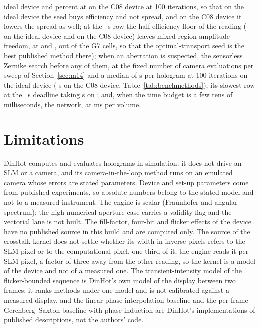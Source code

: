 ideal device and \gsMrafDeviceHundredSig{} percent at \gsMrafDeviceHundredEff{} on the C08 device at 100 iterations, so that on the ideal device the seed buys efficiency and not spread, and on the C08 device it lowers the spread as well; at the \dlReadS{}~s row the half-efficiency floor of the reading (\gsFloorIdeal{} on the ideal device and \gsFloorDevice{} on the C08 device) leaves mixed-region amplitude freedom, at \gsMrafIdealOneEff{} and \gsMrafDeviceOneEff{}, out of the G7 cells, so that the optimal-transport seed is the best published method there); when an aberration is suspected, the sensorless Zernike search before any of them, at the fixed number of camera evaluations per sweep of Section~\ref{sec:m14} and a median of \zernikeIdealSec{} s per hologram at 100 iterations on the ideal device (\zernikeDeviceSec{} s on the C08 device, Table~\ref{tab:benchmethods}), its slowest row at the \dlReadS{}~s deadline taking \zernikeReadMaxSec{} s on \zernikeReadMaxGeometry{}; and, when the time budget is a few tens of milliseconds, the network, at \cghNetMs{} ms per volume.

\section{Limitations}\label{sec:limitations}

DinHot computes and evaluates holograms in simulation: it does not drive an SLM or a camera, and its camera-in-the-loop method runs on an emulated camera whose errors are stated parameters. Device and set-up parameters come from published experiments, so absolute numbers belong to the stated model and not to a measured instrument. The engine is scalar (Fraunhofer and angular spectrum); the high-numerical-aperture case carries a validity flag and the vectorial lane is not built. The fill-factor, four-bit and flicker effects of the device have no published source in this build and are computed only. The source of the crosstalk kernel does not settle whether its width in inverse pixels refers to the SLM pixel or to the computational pixel, one third of it; the engine reads it per SLM pixel, a factor of three away from the other reading, so the kernel is a model of the device and not of a measured one. The transient-intensity model of the flicker-bounded sequence is DinHot's own model of the display between two frames; it ranks methods under one model and is not calibrated against a measured display, and the linear-phase-interpolation baseline and the per-frame Gerchberg--Saxton baseline with phase induction are DinHot's implementations of published descriptions, not the authors' code.

